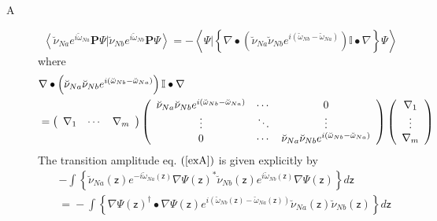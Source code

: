 \documentclass[aps,preprint]{revtex4}%
\begin{document}
\begin{description}
\item[A]
\begin{equation}
\left\langle \breve{\nu}_{Na}e^{i\breve{\omega}_{Na}}\mathbf{P}\Psi|\breve
{\nu}_{Nb}e^{i\breve{\omega}_{Nb}}\mathbf{P}\Psi\right\rangle =-\left\langle
\Psi|\left\{  \nabla\bullet\left(  \breve{\nu}_{Na}\breve{\nu}_{Nb}e^{i\left(
\breve{\omega}_{Nb}-\breve{\omega}_{Na}\right)  }\right)  \mathbb{I}%
\bullet\nabla\right\}  \Psi\right\rangle \label{exA}%
\end{equation}
where
\begin{align}
&  \nabla\bullet\left(  \breve{\nu}_{Na}\breve{\nu}_{Nb}e^{i\left(
\breve{\omega}_{Nb}-\breve{\omega}_{Na}\right)  }\right)  \mathbb{I}%
\bullet\nabla\nonumber\\
&  =\left(
\begin{array}
[c]{ccc}%
\nabla_{1} & \cdots & \nabla_{m}%
\end{array}
\right)  \left(
\begin{array}
[c]{ccc}%
\breve{\nu}_{Na}\breve{\nu}_{Nb}e^{i\left(  \breve{\omega}_{Nb}-\breve{\omega
}_{Na}\right)  } & \cdots & 0\\
\vdots & \ddots & \vdots\\
0 & \cdots & \breve{\nu}_{Na}\breve{\nu}_{Nb}e^{i\left(  \breve{\omega}%
_{Nb}-\breve{\omega}_{Na}\right)  }%
\end{array}
\right)  \left(
\begin{array}
[c]{c}%
\nabla_{1}\\
\vdots\\
\nabla_{m}%
\end{array}
\right)
\end{align}
The transition amplitude eq. $\left(  \ref{exA}\right)  $ is given explicitly
by
\begin{align}
&  -%
{\displaystyle\int}
\left\{  \breve{\nu}_{Na}\left(  \mathsf{z}\right)  e^{-i\breve{\omega}%
_{Na}\left(  \mathsf{z}\right)  }\nabla\Psi\left(  \mathsf{z}\right)  ^{\ast
}\breve{\nu}_{Nb}\left(  \mathsf{z}\right)  e^{i\breve{\omega}_{Nb}\left(
\mathsf{z}\right)  }\nabla\Psi\left(  \mathsf{z}\right)  \right\}
d\mathsf{z}\nonumber\\
&  \left.  =\right.  -%
{\displaystyle\int}
\left\{  \nabla\Psi\left(  \mathsf{z}\right)  ^{\dagger}\bullet\nabla
\Psi\left(  \mathsf{z}\right)  e^{i\left(  \breve{\omega}_{Nb}\left(
\mathsf{z}\right)  -\breve{\omega}_{Na}\left(  \mathsf{z}\right)  \right)
}\breve{\nu}_{Na}\left(  \mathsf{z}\right)  \breve{\nu}_{Nb}\left(
\mathsf{z}\right)  \right\}  d\mathsf{z}%
\end{align}



\end{description}
\end{document}
